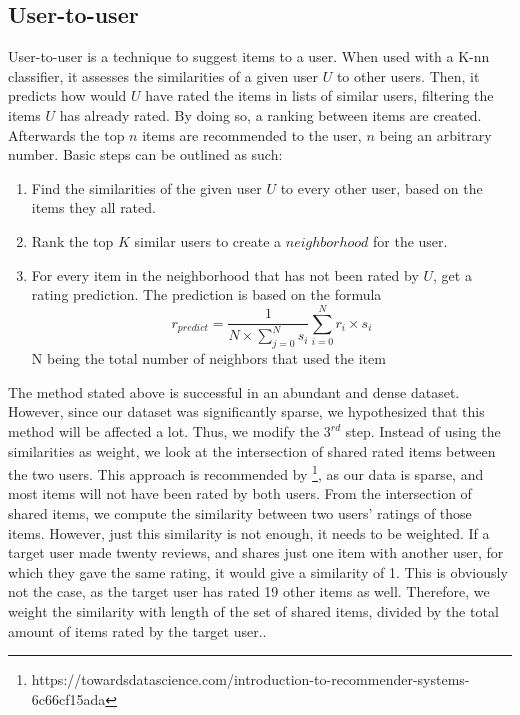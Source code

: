 \documentclass[11pt]{article}
\begin{document}
\subsection{User-to-user}
User-to-user is a technique to suggest items to a user. When used with a K-nn classifier, it assesses the similarities of a given user $U$ to other users. Then, it predicts how would $U$ have rated the items in lists of similar users, filtering the items $U$ has already rated. By doing so, a ranking between items are created. Afterwards the top $n$ items are recommended to the user, $n$ being an arbitrary number. Basic steps can be outlined as such:
\begin{enumerate}
	\item Find the similarities of the given user $U$ to every other user, based on the items they all rated.
	\item Rank the top $K$ similar users to create a $neighborhood$ for the user.
	\item For every item in the neighborhood that has not been rated by $U$, get a rating prediction. The prediction is based on the formula $$r_{predict}=\frac{1}{N\times\sum_{j=0}^{N}s_i}\sum_{i=0}^{N}r_i\times s_i$$N being the total number of neighbors that used the item
\end{enumerate}
The method stated above is successful in an abundant and dense dataset. However, since our dataset was significantly sparse, we hypothesized that this method will be affected a lot. Thus, we modify the $3^{rd}$ step. Instead of using the similarities as weight, we look at the intersection of shared rated items between the two users. This approach is recommended by \footnote[1]{https://towardsdatascience.com/introduction-to-recommender-systems-6c66cf15ada}, as our data is sparse, and most items will not have been rated by both users. From the intersection of shared items, we compute the similarity between two users' ratings of those items. However, just this similarity is not enough, it needs to be weighted. If a target user made twenty reviews, and shares just one item with another user, for which they gave the same rating, it would give a similarity of 1. This is obviously not the case, as the target user has rated 19 other items as well. Therefore, we weight the similarity with length of the set of shared items, divided by the total amount of items rated by the target user.. 
\end{document}
